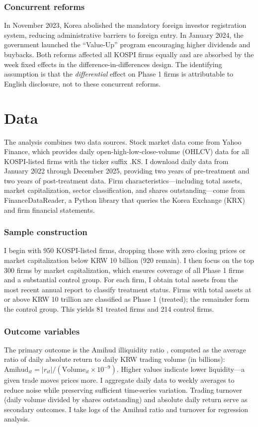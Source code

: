 \documentclass[12pt]{article}
\begin{document}
\subsubsection*{Concurrent reforms} In November 2023, Korea abolished the mandatory foreign investor registration system, reducing administrative barriers to foreign entry. In January 2024, the government launched the ``Value-Up'' program encouraging higher dividends and buybacks. Both reforms affected all KOSPI firms equally and are absorbed by the week fixed effects in the difference-in-differences design. The identifying assumption is that the \emph{differential} effect on Phase 1 firms is attributable to English disclosure, not to these concurrent reforms.


\section{Data}

The analysis combines two data sources. Stock market data come from Yahoo Finance, which provides daily open-high-low-close-volume (OHLCV) data for all KOSPI-listed firms with the ticker suffix .KS. I download daily data from January 2022 through December 2025, providing two years of pre-treatment and two years of post-treatment data. Firm characteristics---including total assets, market capitalization, sector classification, and shares outstanding---come from FinanceDataReader, a Python library that queries the Korea Exchange (KRX) and firm financial statements.

\subsubsection*{Sample construction} I begin with 950 KOSPI-listed firms, dropping those with zero closing prices or market capitalization below KRW 10 billion (920 remain). I then focus on the top 300 firms by market capitalization, which ensures coverage of all Phase 1 firms and a substantial control group. For each firm, I obtain total assets from the most recent annual report to classify treatment status. Firms with total assets at or above KRW 10 trillion are classified as Phase 1 (treated); the remainder form the control group. This yields 81 treated firms and 214 control firms.

\subsubsection*{Outcome variables} The primary outcome is the Amihud illiquidity ratio \citep{amihud2002}, computed as the average ratio of daily absolute return to daily KRW trading volume (in billions): $\text{Amihud}_{it} = |r_{it}| / (\text{Volume}_{it} \times 10^{-9})$. Higher values indicate lower liquidity---a given trade moves prices more. I aggregate daily data to weekly averages to reduce noise while preserving sufficient time-series variation. Trading turnover (daily volume divided by shares outstanding) and absolute daily return serve as secondary outcomes. I take logs of the Amihud ratio and turnover for regression analysis.
\end{document}
